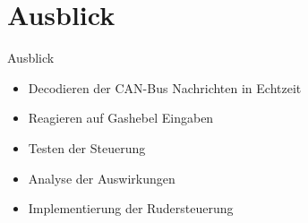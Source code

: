 \documentclass[usenames, dvipsnames, aspectratio=75]{beamer}
\begin{document}
\section{Ausblick}
\begin{frame}{Ausblick}
    \begin{itemize}
        \item Decodieren der CAN-Bus Nachrichten in Echtzeit
        \item Reagieren auf Gashebel Eingaben
        \item Testen der Steuerung
        \item Analyse der Auswirkungen
        \item Implementierung der Rudersteuerung
    \end{itemize}
\end{frame}

\end{document}

